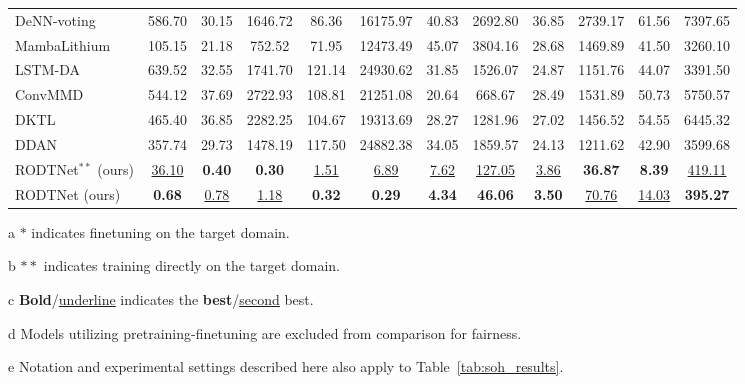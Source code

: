 \documentclass[lettersize,journal]{IEEEtran}
\begin{document}
\begin{table}[htbp]
{\begin{adjustbox}{center}
{\begin{threeparttable}
\begin{tabular}{lccccccccccc}
        DeNN-voting \cite{10102497} & 586.70  & 30.15  & 1646.72  & 86.36  & 16175.97  & 40.83  & 2692.80  & 36.85  & 2739.17  & 61.56  & 7397.65  \\
        MambaLithium \cite{shi2024mambalithiumselectivestatespace} & 105.15  & 21.18  & 752.52  & 71.95  & 12473.49  & 45.07  & 3804.16  & 28.68  & 1469.89  & 41.50  & 3260.10  \\
        LSTM-DA \cite{HAN2022230823} & 639.52  & 32.55  & 1741.70  & 121.14  & 24930.62  & 31.85  & 1526.07  & 24.87  & 1151.76  & 44.07  & 3391.50  \\
        ConvMMD \cite{9788003} & 544.12  & 37.69  & 2722.93  & 108.81  & 21251.08  & 20.64  & 668.67  & 28.49  & 1531.89  & 50.73  & 5750.57  \\
        DKTL \cite{10029904}  & 465.40  & 36.85  & 2282.25  & 104.67  & 19313.69  & 28.27  & 1281.96  & 27.02  & 1456.52  & 54.55  & 6445.32  \\
        DDAN \cite{9560040}  & 357.74  & 29.73  & 1478.19  & 117.50  & 24882.38  & 34.05  & 1859.57  & 24.13  & 1211.62  & 42.90  & 3599.68  \\
        RODTNet$^{\ast\ast}$ {(ours)} & \underline{36.10}  & \textbf{0.40} & \textbf{0.30} & \underline{1.51}  & \underline{6.89}  & \underline{7.62}  & \underline{127.05}  & \underline{3.86}  & \textbf{36.87} & \textbf{8.39} & \underline{419.11}  \\
        RODTNet (ours) & \textbf{0.68} & \underline{0.78}  & \underline{1.18}  & \textbf{0.32} & \textbf{0.29} & \textbf{4.34} & \textbf{46.06} & \textbf{3.50} & \underline{70.76}  & \underline{14.03}  & \textbf{395.27} \\
        \bottomrule
        \end{tabular}%
    \begin{tablenotes}
    \item[a] $\ast$ indicates finetuning on the target domain.
    \item[b] $\ast\ast$ indicates training directly on the target domain.
    \item[c] \textbf{Bold}/\underline{underline} indicates the \textbf{best}/\underline{second} best.
    \item[d] Models utilizing pretraining-finetuning are excluded from comparison for fairness.
    \item[e] Notation and experimental settings described here also apply to Table~\ref{tab:soh_results}.
\end{tablenotes}
\end{threeparttable}}
\end{adjustbox}
}
\label{tab:rul_results}%
\end{table}%
\end{document}
